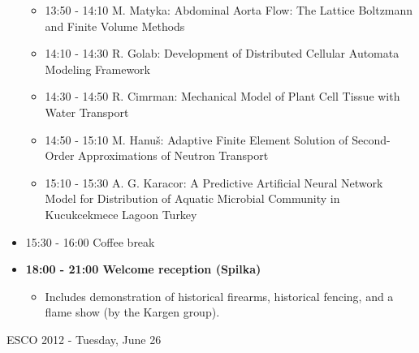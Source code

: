 \documentclass[10pt, A4]{article}%
\begin{document}
\begin{itemize}
\begin{itemize}
    \item 13:50 - 14:10 M. Matyka: Abdominal Aorta Flow: The Lattice Boltzmann and Finite Volume Methods
    \item 14:10 - 14:30 R. Golab: Development of Distributed Cellular Automata Modeling Framework
    \item 14:30 - 14:50 R. Cimrman: Mechanical Model of Plant Cell Tissue with Water Transport
    \item 14:50 - 15:10 M. Hanu\v{s}: Adaptive Finite Element Solution of Second-Order Approximations of Neutron Transport
    \item 15:10 - 15:30 A. G. Karacor: A Predictive Artificial Neural Network Model for Distribution of Aquatic Microbial Community in Kucukcekmece Lagoon Turkey
  \end{itemize}
  \item 15:30 - 16:00 Coffee break
  \item {\bf 18:00 - 21:00 Welcome reception (Spilka)} 
  \begin{itemize}
     \item Includes demonstration of historical firearms, historical fencing, and a flame show (by the Kargen group).  
  \end{itemize}
\end{itemize}

\newpage

\centerline{\huge ESCO 2012 - Tuesday, June 26}
\vspace{4mm}
\end{document}
